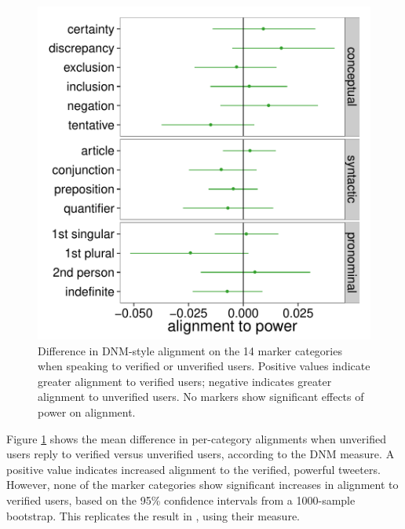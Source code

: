 \documentclass{acm_proc_article-sp}
\begin{document}
\begin{figure}[t]
\centering
\includegraphics[width=.9\columnwidth]{graphics/www2016_dnmpowerdiff_verif_final.pdf}
\caption{Difference in DNM-style alignment on the 14 marker categories when speaking to verified or unverified users. Positive values indicate greater alignment to verified users; negative indicates greater alignment to unverified users. No markers show significant effects of power on alignment.}\label{fig:dnm-verified}
\end{figure}

Figure \ref{fig:dnm-verified} shows the mean difference in per-category alignments when unverified users reply to verified versus unverified users, according to the DNM measure.  A positive value indicates increased alignment to the verified, powerful tweeters.  However, none of the marker categories show significant increases in alignment to verified users, based on the 95\% confidence intervals from a 1000-sample bootstrap.  This replicates the result in \cite{DNMGamonDumais2011}, using their measure.
\end{document}
